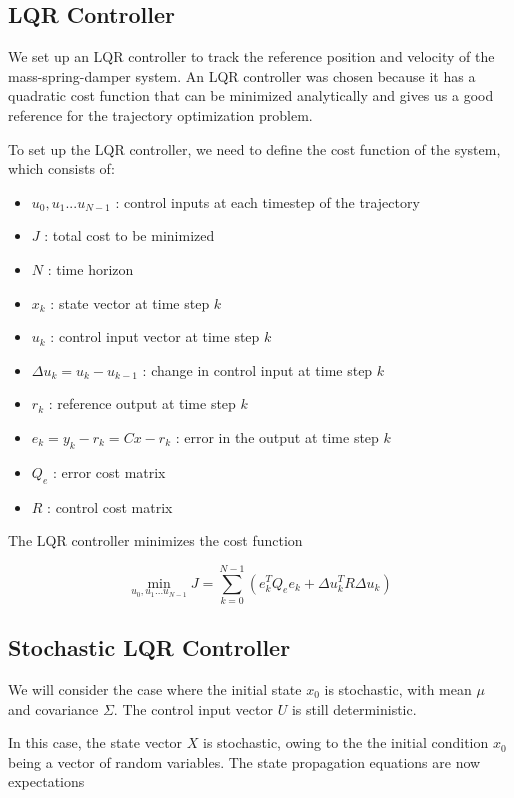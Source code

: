 \documentclass{article}
\begin{document}
\subsection{LQR Controller} \label{lqr_ctrl}
We set up an LQR controller to track the reference position and velocity of the mass-spring-damper system.
An LQR controller was chosen because it has a quadratic cost function that can be minimized analytically and gives us a
good reference for the trajectory optimization problem.

To set up the LQR controller, we need to define the cost function of the system, which consists of:

\begin{itemize}
  \item $u_0, u_1 ... u_{N-1}$ : control inputs at each timestep of the trajectory
  \item $J$ : total cost to be minimized
  \item $N$ : time horizon
  \item $x_k$ : state vector at time step $k$
  \item $u_k$ : control input vector at time step $k$
  \item $\Delta u_k = u_k - u_{k-1}$ : change in control input at time step $k$
  \item $r_k$ : reference output at time step $k$
  \item $e_k = y_k - r_k = Cx - r_k$ : error in the output at time step $k$
  \item $Q_e$ : error cost matrix
  \item $R$ : control cost matrix
\end{itemize}
The LQR controller minimizes the cost function

\begin{equation}
  \min_{u_0, u_1 ... u_{N-1}}J = \sum_{k=0}^{N-1} (e_k^T Q_e e_k + \Delta u_k^T R \Delta u_k)
\end{equation}

\subsection{Stochastic LQR Controller} \label{stochastic_lqr}
We will consider the case where the initial state $x_0$ is stochastic, with mean $\mu$ and covariance $\Sigma$.
The control input vector $U$ is still deterministic.

In this case, the state vector $X$ is stochastic, owing to the the initial condition $x_0$ being a vector of random variables. The state propagation equations are now expectations
\end{document}
